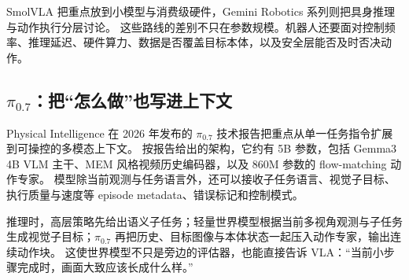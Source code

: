 SmolVLA 把重点放到小模型与消费级硬件\cite{smolvla2025ch5}，Gemini Robotics 系列则把具身推理与动作执行分层讨论\cite{geminirobotics2026ch5}。
这些路线的差别不只在参数规模。机器人还要面对控制频率、推理延迟、硬件算力、数据是否覆盖目标本体，以及安全层能否及时否决动作。

\subsection{$\pi_{0.7}$：把“怎么做”也写进上下文}

Physical Intelligence 在 2026 年发布的 $\pi_{0.7}$ 技术报告把重点从单一任务指令扩展到可操控的多模态上下文\cite{pi072026ch5}。
按报告给出的架构，它约有 5B 参数，包括 Gemma3 4B VLM 主干、MEM 风格视频历史编码器，以及 860M 参数的 flow-matching 动作专家。
模型除当前观测与任务语言外，还可以接收子任务语言、视觉子目标、执行质量与速度等 episode metadata、错误标记和控制模式。

推理时，高层策略先给出语义子任务；轻量世界模型根据当前多视角观测与子任务生成视觉子目标；$\pi_{0.7}$ 再把历史、目标图像与本体状态一起压入动作专家，输出连续动作块。
这使世界模型不只是旁边的评估器，也能直接告诉 VLA：“当前小步骤完成时，画面大致应该长成什么样。”

